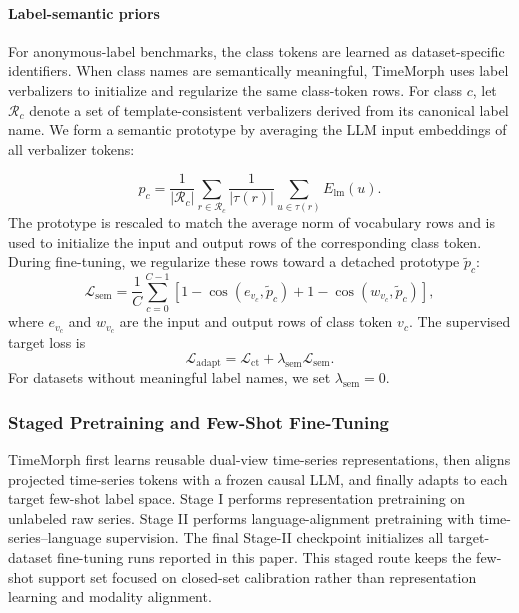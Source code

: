 \documentclass[10pt,journal,compsoc]{IEEEtran}
\begin{document}
\paragraph{Label-semantic priors}
For anonymous-label benchmarks, the class tokens are learned as dataset-specific identifiers.
When class names are semantically meaningful, TimeMorph uses label verbalizers to initialize and regularize the same class-token rows.
For class $c$, let $\mathcal{R}_c$ denote a set of template-consistent verbalizers derived from its canonical label name.
We form a semantic prototype by averaging the LLM input embeddings of all verbalizer tokens:

\begin{equation}
\label{eq:semantic-prototype}
p_c
=
\frac{1}{|\mathcal{R}_c|}
\sum_{r\in\mathcal{R}_c}
\frac{1}{|\tau(r)|}
\sum_{u\in\tau(r)}
E_{\mathrm{lm}}(u).
\end{equation}
The prototype is rescaled to match the average norm of vocabulary rows and is used to initialize the input and output rows of the corresponding class token.
During fine-tuning, we regularize these rows toward a detached prototype $\tilde{p}_c$:
\begin{equation}
\label{eq:semantic-row-reg}
\mathcal{L}_{\mathrm{sem}}
=
\frac{1}{C}
\sum_{c=0}^{C-1}
\left[
1-\cos(e_{v_c},\tilde{p}_c)
+
1-\cos(w_{v_c},\tilde{p}_c)
\right],
\end{equation}
where $e_{v_c}$ and $w_{v_c}$ are the input and output rows of class token $v_c$.
The supervised target loss is
\begin{equation}
\label{eq:adapt-loss}
\mathcal{L}_{\mathrm{adapt}}
=
\mathcal{L}_{\mathrm{ct}}
+
\lambda_{\mathrm{sem}}\mathcal{L}_{\mathrm{sem}}.
\end{equation}
For datasets without meaningful label names, we set $\lambda_{\mathrm{sem}}=0$.

\subsubsection{Staged Pretraining and Few-Shot Fine-Tuning}

\label{sec:pretraining-adaptation}
TimeMorph first learns reusable dual-view time-series representations, then aligns projected time-series tokens with a frozen causal LLM, and finally adapts to each target few-shot label space.
Stage I performs representation pretraining on unlabeled raw series.
Stage II performs language-alignment pretraining with time-series--language supervision.
The final Stage-II checkpoint initializes all target-dataset fine-tuning runs reported in this paper.
This staged route keeps the few-shot support set focused on closed-set calibration rather than representation learning and modality alignment.
\end{document}
